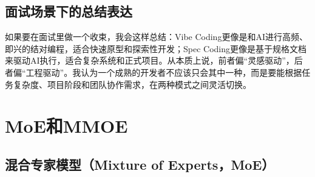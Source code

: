 \documentclass[UTF8]{ctexart}
\begin{document}
\subsection{面试场景下的总结表达}

如果要在面试里做一个收束，我会这样总结：Vibe Coding更像是和AI进行高频、即兴的结对编程，适合快速原型和探索性开发；Spec Coding更像是基于规格文档来驱动AI执行，适合复杂系统和正式项目。从本质上说，前者偏“灵感驱动”，后者偏“工程驱动”。我认为一个成熟的开发者不应该只会其中一种，而是要能根据任务复杂度、项目阶段和团队协作需求，在两种模式之间灵活切换。

\section{MoE和MMOE}
\subsection{混合专家模型（Mixture of Experts，MoE）}
\end{document}

